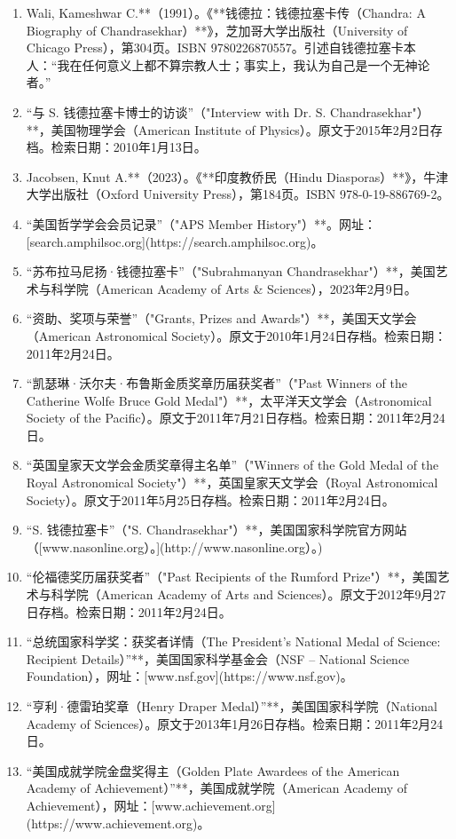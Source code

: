 \begin{enumerate}
\item Wali, Kameshwar C.**（1991）。《**钱德拉：钱德拉塞卡传（Chandra: A Biography of Chandrasekhar）**》，芝加哥大学出版社（University of Chicago Press），第304页。ISBN 9780226870557。引述自钱德拉塞卡本人：“我在任何意义上都不算宗教人士；事实上，我认为自己是一个无神论者。”
\item “与 S. 钱德拉塞卡博士的访谈”（"Interview with Dr. S. Chandrasekhar"）**，美国物理学会（American Institute of Physics）。原文于2015年2月2日存档。检索日期：2010年1月13日。
\item Jacobsen, Knut A.**（2023）。《**印度教侨民（Hindu Diasporas）**》，牛津大学出版社（Oxford University Press），第184页。ISBN 978-0-19-886769-2。
\item “美国哲学学会会员记录”（"APS Member History"）**。网址：[search.amphilsoc.org](https://search.amphilsoc.org)。
\item “苏布拉马尼扬·钱德拉塞卡”（"Subrahmanyan Chandrasekhar"）**，美国艺术与科学院（American Academy of Arts & Sciences），2023年2月9日。
\item “资助、奖项与荣誉”（"Grants, Prizes and Awards"）**，美国天文学会（American Astronomical Society）。原文于2010年1月24日存档。检索日期：2011年2月24日。
\item “凯瑟琳·沃尔夫·布鲁斯金质奖章历届获奖者”（"Past Winners of the Catherine Wolfe Bruce Gold Medal"）**，太平洋天文学会（Astronomical Society of the Pacific）。原文于2011年7月21日存档。检索日期：2011年2月24日。
\item “英国皇家天文学会金质奖章得主名单”（"Winners of the Gold Medal of the Royal Astronomical Society"）**，英国皇家天文学会（Royal Astronomical Society）。原文于2011年5月25日存档。检索日期：2011年2月24日。
\item “S. 钱德拉塞卡”（"S. Chandrasekhar"）**，美国国家科学院官方网站（[www.nasonline.org）。](http://www.nasonline.org）。)
\item “伦福德奖历届获奖者”（"Past Recipients of the Rumford Prize"）**，美国艺术与科学院（American Academy of Arts and Sciences）。原文于2012年9月27日存档。检索日期：2011年2月24日。
\item “总统国家科学奖：获奖者详情（The President's National Medal of Science: Recipient Details）”**，美国国家科学基金会（NSF – National Science Foundation），网址：[www.nsf.gov](https://www.nsf.gov)。
\item “亨利·德雷珀奖章（Henry Draper Medal）”**，美国国家科学院（National Academy of Sciences）。原文于2013年1月26日存档。检索日期：2011年2月24日。
\item “美国成就学院金盘奖得主（Golden Plate Awardees of the American Academy of Achievement）”**，美国成就学院（American Academy of Achievement），网址：[www.achievement.org](https://www.achievement.org)。

\end{enumerate}

